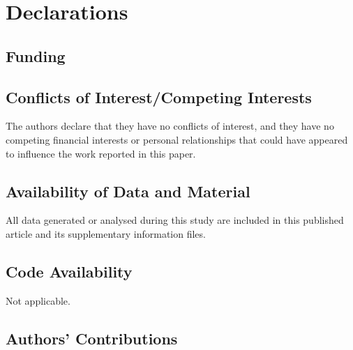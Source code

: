 	
	
	
\section*{Declarations}
\subsection*{Funding}
	
	
\subsection*{Conflicts of Interest/Competing Interests}
	
The authors declare that they have no conflicts of interest, and they have no competing financial interests or personal relationships that could have appeared to influence the work reported in this paper.
	
\subsection*{Availability of Data and Material}
	
All data generated or analysed during this study are included in this published article and its supplementary information files.
	
\subsection*{Code Availability}
	
Not applicable.
	
\subsection*{Authors' Contributions}
	
